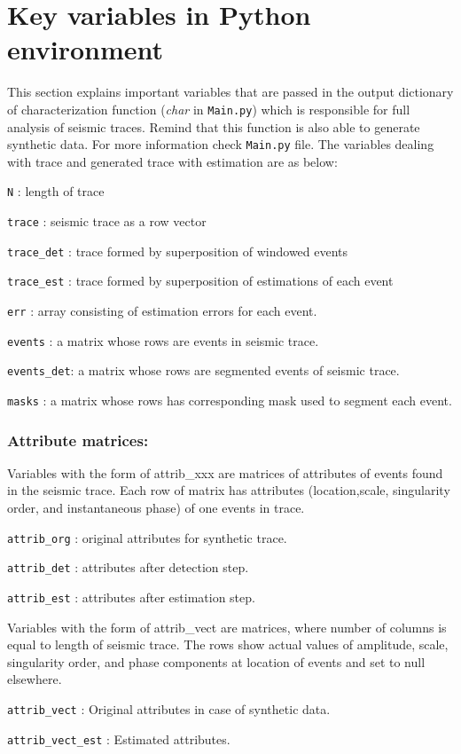 \documentclass[12pt,titlepage]{article}
\begin{document}
\section*{Key variables in Python environment}

This section explains important variables that are passed in the
output dictionary of characterization function (\textit{char} in
\texttt{Main.py}) which is responsible for full analysis of seismic
traces. Remind that this function is also able to generate synthetic
data. For more information check \texttt{Main.py} file. The variables
dealing with trace and generated trace with estimation are as below:
\begin{description}
\item \texttt{N}	: length of trace
\item \texttt{trace} : seismic trace as a row vector
\item \texttt{trace\_det} : trace formed by superposition of windowed
  events
\item \texttt{trace\_est} : trace formed by superposition of
  estimations of each event
\item \texttt{err} : array consisting of estimation errors for each event.
\item \texttt{events} : a matrix whose rows are events in seismic
  trace.
\item \texttt{events\_det}: a matrix whose rows are segmented events
  of seismic trace.
\item \texttt{masks} : a matrix whose rows has corresponding mask used
  to segment each event.

\end{description}
%
\subsubsection*{Attribute matrices:}
Variables with the form of attrib\_xxx are matrices of attributes of
events found in the seismic trace. Each row of matrix has attributes
(location,scale, singularity order, and instantaneous phase) of one
events in trace.
\begin{description}
\item \texttt{attrib\_org} : original attributes for synthetic trace.
\item \texttt{attrib\_det} : attributes after detection step.
\item \texttt{attrib\_est} : attributes after estimation step.
\end{description}
%
Variables with the form of attrib\_vect are matrices, where number of
columns is equal to length of seismic trace. The rows show actual
values of amplitude, scale, singularity order, and phase components at
location of events and set to null elsewhere.
\begin{description}
\item \texttt{attrib\_vect} : Original attributes in case of synthetic data.
\item \texttt{attrib\_vect\_est} : Estimated attributes.
\end{description}
%
\end{document}
